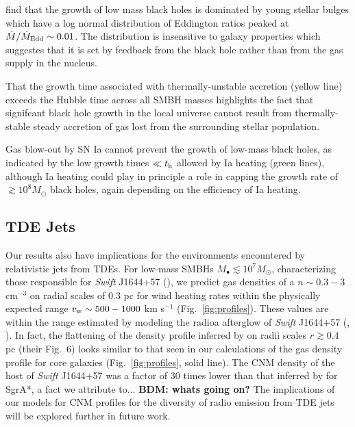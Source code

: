 \documentclass[usenatbib,fleqn]{mn2e}
\newcommand{\Mdot}{\dot{M}}
\newcommand{\MdotEdd}{\dot{M}_{\rm Edd}}
\begin{document}
\citet{Kauffmann&Heckman09} find that the growth of low mass black
holes is dominated by young stellar bulges which have a log normal
distribution of Eddington ratios peaked at $\Mdot/\MdotEdd\sim
0.01$. The distribution is insensitive to galaxy properties which
suggestes that it is set by feedback from the black hole rather than
from the gas supply in the nucleus.

That the growth time associated with thermally-unstable accretion
(yellow line) exceeds the Hubble time across all SMBH masses
highlights the fact that signifcant black hole growth in the local
universe cannot result from thermally-stable steady accretion of gas
lost from the surrounding stellar population.

Gas blow-out by SN Ia cannot prevent the growth of low-mass black
holes, as indicated by the low growth times $\ll t_{\rm h}$ allowed by
Ia heating (green lines), although Ia heating could play in principle
a role in capping the growth rate of $\gtrsim 10^{8}M_{\odot}$ black
holes, again depending on the efficiency of Ia heating.


\subsection{TDE Jets}
\label{sec:TDE}

Our results also have implications for the environments encountered by
relativistic jets from TDEs.  For low-mass SMBHs $M_{\bullet} \lesssim
10^{7}M_{\odot}$, characterizing those responsible for {\it Swift}
J1644+57 (\citealt{Bloom+11}), we predict gas densities of a $n
\sim 0.3-3$ cm$^{-3}$ on radial scales of 0.3 pc for wind heating
rates within the physically expected range $v_{\rm w} \sim 500-1000$
km s$^{-1}$ (Fig.~\ref{fig:profiles}).  These values are within the
range estimated by modeling the radioa afterglow of {\it Swift}
J1644+57 (\citealt{Metzger+12}, \citealt{BergerZauderer+:2012a}).  In fact, the
flattening of the density profile inferred by \citet{BergerZauderer+:2012a} on
radii scales $r \gtrsim 0.4$ pc (their Fig.~6) looks similar to that
seen in our calculations of the gas density profile for core galaxies
(Fig.~\ref{fig:profiles}, solid line).  The CNM density of the host of
{\it Swift} J1644+57 was a factor of 30 times lower than that inferred
by \citet{Quataert:2004a} for SgrA*, a fact we attribute to...{\bf
  BDM: whats going on?}  The implications of our models for CNM
profiles for the diversity of radio emission from TDE jets will be
explored further in future work.
\end{document}

